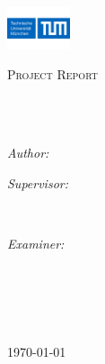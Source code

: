 \documentclass[
11pt, 
english, 
singlespacing, %
table, %
openany, %
headsepline, %
]{ProjectReport} %
\author{Tapan \textsc{Sharma}} %
\begin{document}
\frontmatter %

\pagestyle{plain} %


\begin{titlepage}
 \includegraphics[width=5em]{Logo_TUM} %
\begin{center}

\vspace*{.05\textheight}
{\scshape\LARGE \univname\par}\vspace{1.2cm} %
\textsc{\Large Project Report}\\[0.5cm] %

\HRule \\[0.4cm] %
{\huge \bfseries \ttitle\par}\vspace{0.4cm} %
\HRule \\[1.5cm] %
 
\begin{minipage}[t]{0.4\textwidth}
\begin{flushleft} \large
\emph{Author:}\\
{\authorname} %
\end{flushleft}
\end{minipage}
\begin{minipage}[t]{0.4\textwidth}
\begin{flushright} \large
\emph{Supervisor:} \\
{\supname} %
\end{flushright}
\end{minipage}\\[3cm]

\begin{minipage}[t]{0.4\textwidth}
\begin{center}
\emph{Examiner:} \\
{\examname} %
\end{center}
\end{minipage}\\[3cm]
 
\vfill

\groupname\\\facname\\[3cm] %
 
\vfill

{\large \today}\\[4cm] %
 
\vfill
\end{center}
\end{titlepage}
\end{document}
